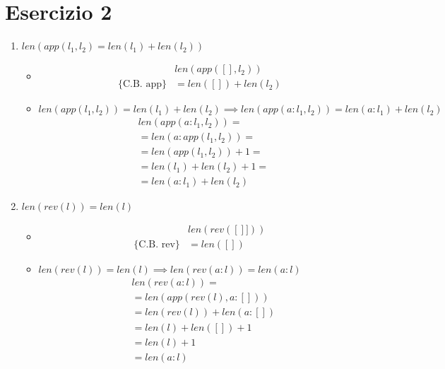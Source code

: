 \documentclass{article}
\begin{document}
\section{Esercizio 2}
\begin{enumerate}
    \item \(len(app(l_1, l_2)  = len(l_1) + len(l_2))\)
          \begin{itemize}
              \item[\text{[C.B.]}]
              \begin{align*}
                   & len(app([], l_2))    \\ \{\text{C.B. app}\}
                   & = len([]) + len(l_2)
              \end{align*}
              \item[\text{[C.I.]}] \(len(app(l_1,l_2)) = len(l_1) + len(l_2) \implies len(app(a:l_1, l_2)) = len(a:l_1) + len(l_2)\)
              \begin{align*}
                   & len(app(a: l_1, l_2)) =     \\
                   & = len(a: app(l_1, l_2)) =   \\
                   & = len(app(l_1,l_2)) + 1 =   \\
                   & = len(l_1) + len(l_2) + 1 = \\
                   & = len(a: l_1) + len(l_2)
              \end{align*}
          \end{itemize}
    \item \(len(rev(l)) = len(l)\)
          \begin{itemize}
              \item[\text{[C.B.]}]
              \begin{align*}
                   & len(rev([]])) \\ \{\text{C.B. rev}\}
                   & = len([])
              \end{align*}
              \item[\text{[C.I.]}] \(len(rev(l)) = len(l) \implies len(rev(a: l)) = len(a: l)\)
              \begin{align*}
                   & len(rev(a: l)) =          \\
                   & = len(app(rev(l), a:[]))  \\
                   & = len(rev(l)) + len(a:[]) \\
                   & = len(l) + len([]) + 1    \\
                   & = len(l) + 1              \\
                   & = len(a: l)
              \end{align*}
          \end{itemize}
\end{enumerate}
\end{document}
